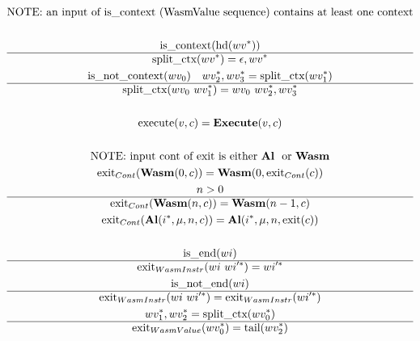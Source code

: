\begin{gather*}
\text{NOTE: an input of is\_context (WasmValue sequence) contains at least one context} \\
%
\newline \\
  \text{is\_context}(\text{hd}(\seq{wv})) \\
  \hline
  \splitctx(\seq{wv}) = \epsilon, \seq{wv} \\
%
  \text{is\_not\_context}(wv_0) \quad \seq{wv_2}, \seq{wv_3} = \splitctx(\seq{wv_1}) \\
  \hline
  \splitctx(wv_0 ~ \seq{wv_1}) = wv_0 ~ \seq{wv_2}, \seq{wv_3} \\
%
\newline \\
  \execute(v, c) = \exe(v, c) \\
%
\newline \\
\text{NOTE: input cont of exit is either \al ~ or \wasm} \\
  \exit_{Cont}(\wasm (0, c)) = \wasm(0, \exit_{Cont}(c)) \\
%
  n > 0 \\
  \hline
  \exit_{Cont}(\wasm (n, c)) = \wasm(n-1, c) \\
%
  \exit_{Cont}(\al (\seq i, \mu, n, c)) = \al (\seq i, \mu, n, \exit(c)) \\
%
\newline \\
  \text{is\_end}(wi) \\
  \hline
  \exit_{WasmInstr}(wi ~ \seq{wi'}) = \seq{wi'} \\
%
  \text{is\_not\_end}(wi) \\
  \hline
  \exit_{WasmInstr}(wi ~ \seq{wi'}) = \exit_{WasmInstr}(\seq{wi'}) \\
%
  \seq{wv_1}, \seq{wv_2} = \splitctx(\seq{wv_0}) \\
  \hline
  \exit_{WasmValue}(\seq{wv_0}) = \text{tail}(\seq{wv_2}) \\
\end{gather*}






